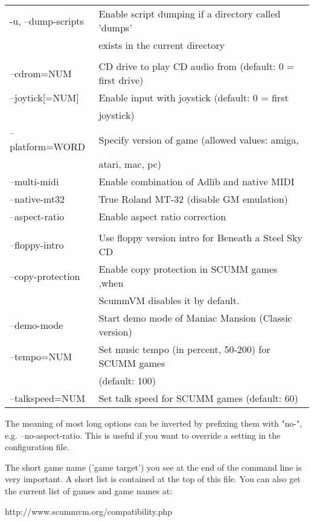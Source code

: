 \begin{tabular}{ll}
  -u, --dump-scripts      &Enable script dumping if a directory called 'dumps'\\
                          &exists in the current directory\\
\\
  --cdrom=NUM             &CD drive to play CD audio from (default: 0 = first drive)\\
  --joytick[=NUM]         &Enable input with joystick (default: 0 = first\\
                          &joystick)\\
  --platform=WORD         &Specify version of game (allowed values: amiga,\\
                          &atari, mac, pc)\\
  --multi-midi            &Enable combination of Adlib and native MIDI\\
  --native-mt32           &True Roland MT-32 (disable GM emulation)\\
  --aspect-ratio          &Enable aspect ratio correction\\
\\
  --floppy-intro          &Use floppy version intro for Beneath a Steel Sky CD\\
  --copy-protection       &Enable copy protection in SCUMM games ,when\\
                          &ScummVM disables it by default.\\
  --demo-mode             &Start demo mode of Maniac Mansion (Classic version)\\
  --tempo=NUM             &Set music tempo (in percent, 50-200) for SCUMM games\\
                          &(default: 100)\\
  --talkspeed=NUM         &Set talk speed for SCUMM games (default: 60)\\
\end{tabular}

The meaning of most long options can be inverted by prefixing them with "no-",
e.g. --no-aspect-ratio. This is useful if you want to override a setting in the
configuration file.

The short game name ('game target') you see at the end of the command
line is very important. A short list is contained at the top of this
file. You can also get the current list of games and game names at:

\begin{center}
  http://www.scummvm.org/compatibility.php
\end{center}

